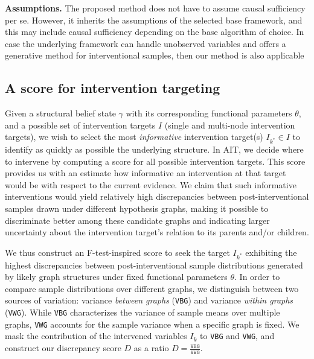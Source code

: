 \documentclass[nohyperref]{article}
\theoremstyle{plain}
\theoremstyle{definition}
\theoremstyle{remark}
\begin{document}
\textbf{Assumptions.} 
The proposed method does not have to assume causal sufficiency per se. However, it inherits the assumptions of the selected base framework, and this may include causal sufficiency depending on the base algorithm of choice. In case the underlying framework can handle unobserved variables and offers a generative method for interventional samples, then our method is also applicable



\vspace{-2mm}
\subsection{A score for intervention targeting}
\label{sec:method_score}
Given a structural belief state $\gamma$ with its corresponding functional parameters $\theta$, and a possible set of intervention targets $I$ (single and multi-node intervention targets), we wish to select the most \textit{informative} intervention target(s) $I_{k^*} \in I$ to identify as quickly as possible the underlying structure. In AIT, we decide where to intervene by computing a score for all possible intervention targets. This score provides us with an estimate how informative an intervention at that target would be with respect to the current evidence. We claim that such informative interventions would yield relatively high discrepancies between post-interventional samples drawn under different hypothesis graphs, making it possible to discriminate better among these candidate graphs and indicating larger uncertainty about the intervention target's relation to its parents and/or children. 

We thus construct an F-test-inspired score to seek the target $I_{k^*}$ exhibiting the highest discrepancies between post-interventional sample distributions generated by likely graph structures under fixed functional parameters $\theta$. In order to compare sample distributions over different graphs, we distinguish between two sources of variation: variance \textit{between graphs} (\texttt{VBG}) and variance \textit{within graphs} (\texttt{VWG}). While \texttt{VBG} characterizes the variance of sample means over multiple graphs, \texttt{VWG} accounts for the sample variance when a specific graph is fixed. %
We mask the contribution of the intervened variables $I_k$ to \texttt{VBG} and \texttt{VWG}, and construct our discrepancy score $D$ as a ratio  $D = \frac{\texttt{VBG}}{\texttt{VWG}}$.
\end{document}
